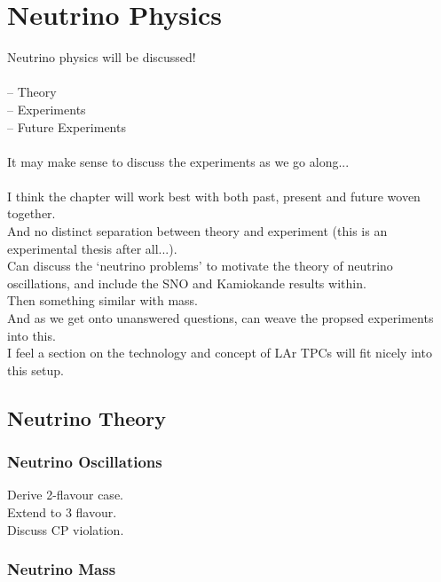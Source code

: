 
\chapter{Neutrino Physics}\label{chap:NeutrinoPhysics}

Neutrino physics will be discussed! \\
\\
-- Theory\\
-- Experiments\\
-- Future Experiments\\
\\
It may make sense to discuss the experiments as we go along...\\
\\
I think the chapter will work best with both past, present and future woven together.\\
And no distinct separation between theory and experiment (this is an experimental thesis after all...).\\
Can discuss the `neutrino problems' to motivate the theory of neutrino oscillations, and include the SNO and Kamiokande results within.\\
Then something similar with mass.\\
And as we get onto unanswered questions, can weave the propsed experiments into this.\\
I feel a section on the technology and concept of LAr TPCs will fit nicely into this setup.\\

\section{Neutrino Theory}\label{sec:NeutrinoTheory}

\subsection{Neutrino Oscillations}\label{sec:NeutrinoOscillations}

Derive 2-flavour case.\\
Extend to 3 flavour.\\
Discuss CP violation.\\

\subsection{Neutrino Mass}\label{sec:NeutrinoMass}

